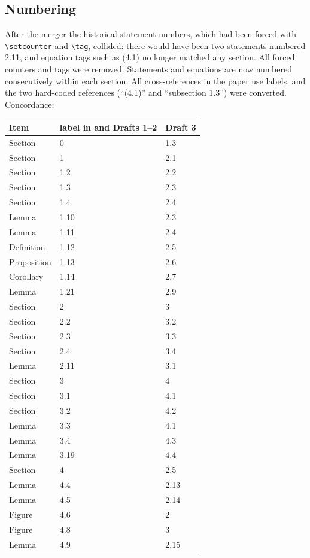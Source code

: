 \documentclass[12pt,letterpaper]{amsart}
\begin{document}
\subsection*{Numbering}
After the merger the historical statement numbers, which had been
forced with \verb|\setcounter| and \verb|\tag|, collided: there would
have been two statements numbered 2.11, and equation tags such as
(4.1) no longer matched any section. All forced counters and tags were
removed. Statements and equations are now numbered consecutively
within each section. All cross-references in the paper use labels, and
the two hard-coded references (``(4.1)'' and ``subsection 1.3'') were
converted. Concordance:

\begin{longtable}{@{}lll@{}}
\toprule
Item & label in \cite{Jo90} and Drafts 1--2 & Draft 3\\
\midrule
\endhead
Section & 0 & 1.3\\
Section & 1 & 2.1\\
Section & 1.2 & 2.2\\
Section & 1.3 & 2.3\\
Section & 1.4 & 2.4\\
Lemma & 1.10 & 2.3\\
Lemma & 1.11 & 2.4\\
Definition & 1.12 & 2.5\\
Proposition & 1.13 & 2.6\\
Corollary & 1.14 & 2.7\\
Lemma & 1.21 & 2.9\\
Section & 2 & 3\\
Section & 2.2 & 3.2\\
Section & 2.3 & 3.3\\
Section & 2.4 & 3.4\\
Lemma & 2.11 & 3.1\\
Section & 3 & 4\\
Section & 3.1 & 4.1\\
Section & 3.2 & 4.2\\
Lemma & 3.3 & 4.1\\
Lemma & 3.4 & 4.3\\
Lemma & 3.19 & 4.4\\
Section & 4 & 2.5\\
Lemma & 4.4 & 2.13\\
Lemma & 4.5 & 2.14\\
Figure & 4.6 & 2\\
Figure & 4.8 & 3\\
Lemma & 4.9 & 2.15\\

\end{longtable}
\end{document}
